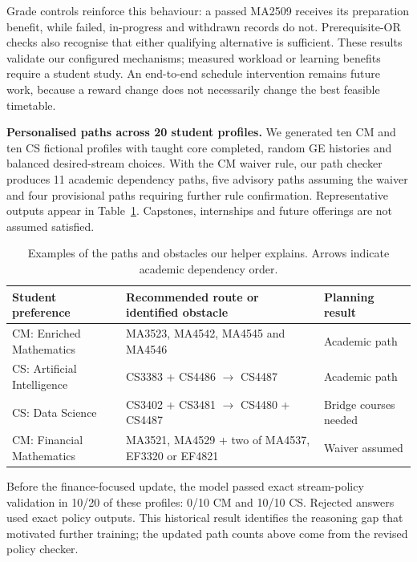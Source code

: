 \documentclass{article}
\begin{document}
Grade controls reinforce this behaviour: a passed MA2509 receives its preparation benefit, while failed, in-progress and withdrawn records do not. Prerequisite-OR checks also recognise that either qualifying alternative is sufficient. These results validate our configured mechanisms; measured workload or learning benefits require a student study. An end-to-end schedule intervention remains future work, because a reward change does not necessarily change the best feasible timetable.

\textbf{Personalised paths across 20 student profiles.} We generated ten CM and ten CS fictional profiles with taught core completed, random GE histories and balanced desired-stream choices. With the CM waiver rule, our path checker produces 11 academic dependency paths, five advisory paths assuming the waiver and four provisional paths requiring further rule confirmation. Representative outputs appear in Table~\ref{tab:examples}. Capstones, internships and future offerings are not assumed satisfied.

\begin{table}[H]
\centering\small
\caption{Examples of the paths and obstacles our helper explains. Arrows indicate academic dependency order.}
\begin{tabular}{p{1.4in}p{2.2in}p{1.4in}}
\toprule
Student preference & Recommended route or identified obstacle & Planning result\\
\midrule
CM: Enriched Mathematics & MA3523, MA4542, MA4545 and MA4546 & Academic path\\
CS: Artificial Intelligence & CS3383 + CS4486 $\rightarrow$ CS4487 & Academic path\\
CS: Data Science & CS3402 + CS3481 $\rightarrow$ CS4480 + CS4487 & Bridge courses needed\\
CM: Financial Mathematics & {\raggedright MA3521, MA4529 + two of MA4537, EF3320 or EF4821\par} & Waiver assumed\\
\bottomrule
\end{tabular}
\label{tab:examples}
\end{table}

Before the finance-focused update, the model passed exact stream-policy validation in 10/20 of these profiles: 0/10 CM and 10/10 CS. Rejected answers used exact policy outputs. This historical result identifies the reasoning gap that motivated further training; the updated path counts above come from the revised policy checker.
\end{document}
